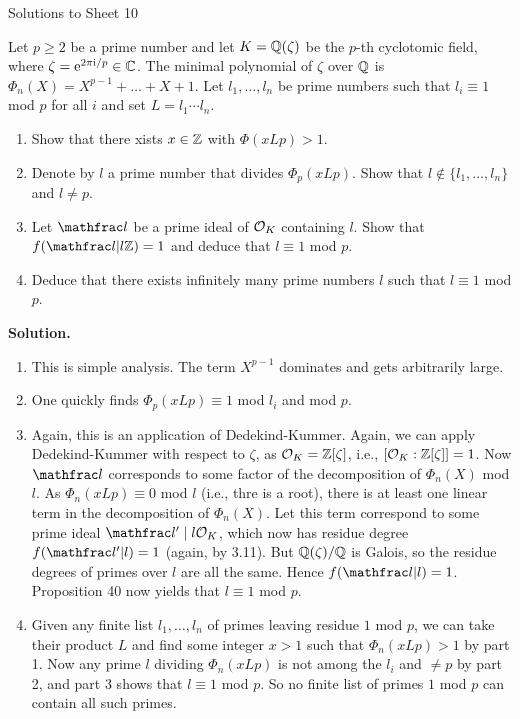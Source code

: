 \documentclass[a4paper,11pt]{article}
\newcommand{\fl}{\mathfrac l}
\begin{document}
\begin{center}
    \huge{Solutions to Sheet 10}
\end{center}

Let $p\geq 2$ be a prime number and let $K = \mathbb{Q}(\zeta)$ be the $p$-th
cyclotomic field, where $\zeta = \mathrm e^{2 \pi \mathrm i /p} \in \mathbb{C}$. The minimal
polynomial of $\zeta$ over $\mathbb{Q}$ is $\Phi_n(X) = X^{p-1} + \dots + X + 1$.
Let $l_1, \dots, l_n$ be prime numbers such that $l_i \equiv 1$ mod $p$
for all $i$ and set $L = l_1 \cdots l_n$.
\begin{enumerate}
    \item Show that there xists $x \in \mathbb{Z}$ with $\Phi(xLp)>1$. 
    \item Denote by $l$ a prime number that divides $\Phi_p(xLp)$. 
        Show that $l \not \in \{l_1, \dots, l_n\}$ and $l \neq p$. 
    \item Let $\fl$ be a prime ideal of $\mathcal{O}_K$ containing $l$. Show that 
        $f(\fl|l\Z) = 1$ and deduce that $l \equiv 1$ mod $p$.
    \item Deduce that there exists infinitely many prime numbers $l$
        such that $l \equiv 1$ mod $p$.
\end{enumerate}
\textbf{Solution.}
\begin{enumerate}[labelindent=0pt, wide]
    \item This is simple analysis. The term $X^{p-1}$ dominates and gets arbitrarily 
        large.
    \item One quickly finds $\Phi_p(xLp) \equiv 1$ mod $l_i$ and mod $p$.
    \item Again, this is an application of Dedekind-Kummer. Again, we can apply 
        Dedekind-Kummer with respect to $\zeta$, as $\mathcal{O}_K = \mathbb{Z}[\zeta]$, i.e.,
        $[\mathcal{O}_K:\mathbb{Z}[\zeta]] = 1$. Now $\fl$ corresponds to some factor of the 
        decomposition of $\Phi_n(X)$ mod $l$. As $\Phi_n(xLp) \equiv 0$ mod $l$ (i.e.,
        thre is a root), there is at least one linear term in the decomposition
        of $\Phi_n(X)$. Let this term correspond to some prime ideal $\fl' \mid
        l\cO_K$, which now has residue degree $f(\fl'|l) = 1$ (again, by 3.11). 
        But $\mathbb{Q}(\zeta)/\mathbb{Q}$ is Galois, so the residue degrees of primes over $l$ are
        all the same. Hence $f(\fl|l) = 1$. Proposition 40 now yields that $l \equiv 1$ 
        mod $p$.
    \item Given any finite list $l_1, \dots, l_n$ of primes leaving residue  
        $1$ mod $p$, we can take their product $L$ and find some integer 
        $x > 1$ such that $\Phi_n(xLp) > 1$ by part 1. Now any prime $l$ dividing
        $\Phi_n(xLp)$ is not among the $l_i$ and $\neq p$ by part 2, and 
        part 3 shows that $l \equiv 1$ mod $p$. So no finite list of primes $1$ mod $p$
        can contain all such primes.


\end{enumerate}
\end{document}
